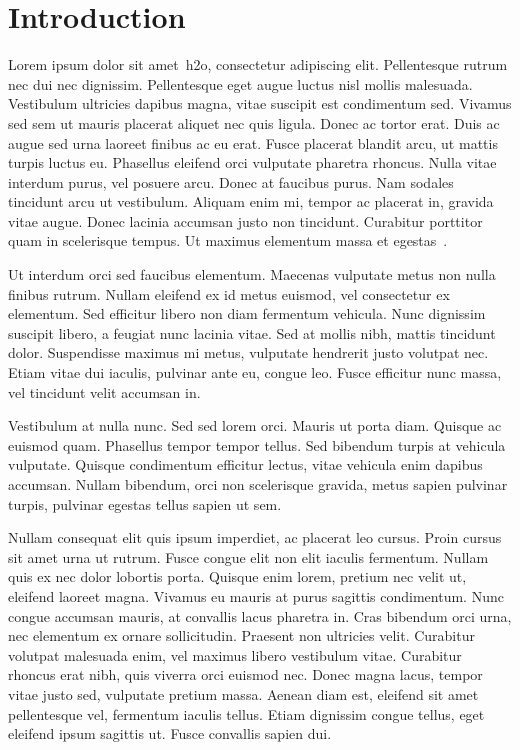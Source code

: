 \chapter{Introduction}

Lorem ipsum dolor sit amet~\ac{h2o}, consectetur adipiscing elit. Pellentesque rutrum nec dui nec dignissim. Pellentesque eget augue luctus nisl mollis malesuada. Vestibulum ultricies dapibus magna, vitae suscipit est condimentum sed. Vivamus sed sem ut mauris placerat aliquet nec quis ligula. Donec ac tortor erat. Duis ac augue sed urna laoreet finibus ac eu erat. Fusce placerat blandit arcu, ut mattis turpis luctus eu. Phasellus eleifend orci vulputate pharetra rhoncus. Nulla vitae interdum purus, vel posuere arcu. Donec at faucibus purus. Nam sodales tincidunt arcu ut vestibulum. Aliquam enim mi, tempor ac placerat in, gravida vitae augue. Donec lacinia accumsan justo non tincidunt. Curabitur porttitor quam in scelerisque tempus. Ut maximus elementum massa et egestas~\cite{DeferredRouting}.

Ut interdum orci sed faucibus elementum. Maecenas vulputate metus non nulla finibus rutrum. Nullam eleifend ex id metus euismod, vel consectetur ex elementum. Sed efficitur libero non diam fermentum vehicula. Nunc dignissim suscipit libero, a feugiat nunc lacinia vitae. Sed at mollis nibh, mattis tincidunt dolor. Suspendisse maximus mi metus, vulputate hendrerit justo volutpat nec. Etiam vitae dui iaculis, pulvinar ante eu, congue leo. Fusce efficitur nunc massa, vel tincidunt velit accumsan in.

Vestibulum at nulla nunc. Sed sed lorem orci. Mauris ut porta diam. Quisque ac euismod quam. Phasellus tempor tempor tellus. Sed bibendum turpis at vehicula vulputate. Quisque condimentum efficitur lectus, vitae vehicula enim dapibus accumsan. Nullam bibendum, orci non scelerisque gravida, metus sapien pulvinar turpis, pulvinar egestas tellus sapien ut sem.

Nullam consequat elit quis ipsum imperdiet, ac placerat leo cursus. Proin cursus sit amet urna ut rutrum. Fusce congue elit non elit iaculis fermentum. Nullam quis ex nec dolor lobortis porta. Quisque enim lorem, pretium nec velit ut, eleifend laoreet magna. Vivamus eu mauris at purus sagittis condimentum. Nunc congue accumsan mauris, at convallis lacus pharetra in. Cras bibendum orci urna, nec elementum ex ornare sollicitudin. Praesent non ultricies velit. Curabitur volutpat malesuada enim, vel maximus libero vestibulum vitae. Curabitur rhoncus erat nibh, quis viverra orci euismod nec. Donec magna lacus, tempor vitae justo sed, vulputate pretium massa. Aenean diam est, eleifend sit amet pellentesque vel, fermentum iaculis tellus. Etiam dignissim congue tellus, eget eleifend ipsum sagittis ut. Fusce convallis sapien dui.

